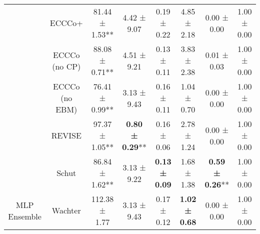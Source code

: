 \begin{table}
{\begin{tabular}[t]{cccccccc}
 & ECCCo+ & 81.44 ± 1.53** & 4.42 ± 9.07\hphantom{*}\hphantom{*} & 0.19 ± 0.22\hphantom{*}\hphantom{*} & 4.85 ± 2.18\hphantom{*}\hphantom{*} & 0.00 ± 0.00\hphantom{*}\hphantom{*} & 1.00 ± 0.00\hphantom{*}\hphantom{*}\\

 & ECCCo (no CP) & 88.08 ± 0.71** & 4.51 ± 9.21\hphantom{*}\hphantom{*} & 0.13 ± 0.11\hphantom{*}\hphantom{*} & 3.83 ± 2.38\hphantom{*}\hphantom{*} & 0.01 ± 0.03\hphantom{*}\hphantom{*} & 1.00 ± 0.00\hphantom{*}\hphantom{*}\\

 & ECCCo (no EBM) & 76.41 ± 0.99** & 3.13 ± 9.43\hphantom{*}\hphantom{*} & 0.16 ± 0.11\hphantom{*}\hphantom{*} & 1.04 ± 0.70\hphantom{*}\hphantom{*} & 0.00 ± 0.00\hphantom{*}\hphantom{*} & 1.00 ± 0.00\hphantom{*}\hphantom{*}\\

 & REVISE & 97.37 ± 1.05** & \textbf{0.80 ± 0.29}** & 0.16 ± 0.06\hphantom{*}\hphantom{*} & 2.78 ± 1.24\hphantom{*}\hphantom{*} & 0.00 ± 0.00\hphantom{*}\hphantom{*} & 1.00 ± 0.00\hphantom{*}\hphantom{*}\\

 & Schut & 86.84 ± 1.62** & 3.13 ± 9.22\hphantom{*}\hphantom{*} & \textbf{0.13 ± 0.09}\hphantom{*}\hphantom{*} & 1.68 ± 1.38\hphantom{*}\hphantom{*} & \textbf{0.59 ± 0.26}** & 1.00 ± 0.00\hphantom{*}\hphantom{*}\\

\multirow[t]{-10}{*}{\centering\arraybackslash MLP Ensemble} & Wachter & 112.38 ± 1.77\hphantom{*}\hphantom{*} & 3.13 ± 9.43\hphantom{*}\hphantom{*} & 0.17 ± 0.12\hphantom{*}\hphantom{*} & \textbf{1.02 ± 0.68}\hphantom{*}\hphantom{*} & 0.00 ± 0.00\hphantom{*}\hphantom{*} & 1.00 ± 0.00\hphantom{*}\hphantom{*}\\
\bottomrule
\end{tabular}}
\end{table}
